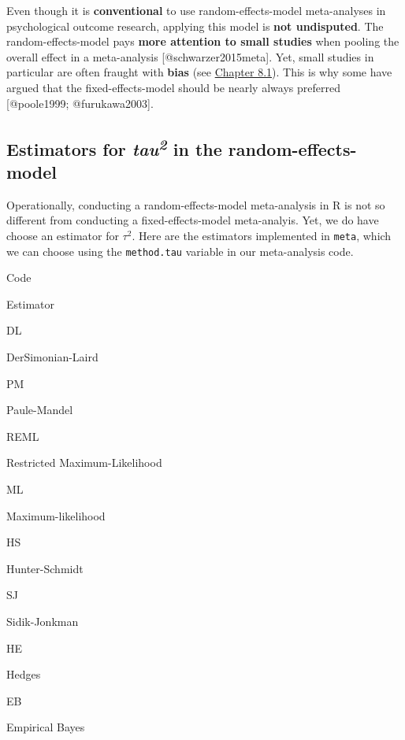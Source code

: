 \documentclass[]{book}
\begin{document}
\begin{rmdachtung}
Even though it is \textbf{conventional} to use random-effects-model
meta-analyses in psychological outcome research, applying this model is
\textbf{not undisputed}. The random-effects-model pays \textbf{more
attention to small studies} when pooling the overall effect in a
meta-analysis {[}@schwarzer2015meta{]}. Yet, small studies in particular
are often fraught with \textbf{bias} (see
\protect\hyperlink{smallstudyeffects}{Chapter 8.1}). This is why some
have argued that the fixed-effects-model should be nearly always
preferred {[}@poole1999; @furukawa2003{]}.
\end{rmdachtung}

\hypertarget{tau2}{%
\subsection{\texorpdfstring{Estimators for \emph{tau\textsuperscript{2}} in the random-effects-model}{Estimators for tau2 in the random-effects-model}}\label{tau2}}

Operationally, conducting a random-effects-model meta-analysis in R is not so different from conducting a fixed-effects-model meta-analyis. Yet, we do have choose an estimator for \(\tau^{2}\). Here are the estimators implemented in \texttt{meta}, which we can choose using the \texttt{method.tau} variable in our meta-analysis code.

Code

Estimator

DL

DerSimonian-Laird

PM

Paule-Mandel

REML

Restricted Maximum-Likelihood

ML

Maximum-likelihood

HS

Hunter-Schmidt

SJ

Sidik-Jonkman

HE

Hedges

EB

Empirical Bayes
\end{document}
